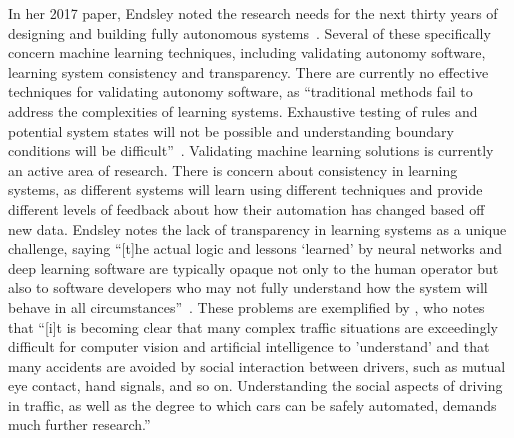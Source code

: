In her 2017 paper, Endsley noted the research needs for the next thirty years of designing and building fully autonomous systems~\citep{endsley_here_2017}.
Several of these specifically concern machine learning techniques, including validating autonomy software, learning system consistency and transparency.
There are currently no effective techniques for validating autonomy software, as ``traditional methods fail to address the complexities of learning systems.
Exhaustive testing of rules and potential system states will not be possible and understanding boundary conditions will be difficult''~\citep{endsley_here_2017}.
Validating machine learning solutions is currently an active area of research.
There is concern about consistency in learning systems, as different systems will learn using different techniques and provide different levels of feedback about how their automation has changed based off new data.
Endsley notes the lack of transparency in learning systems as a unique challenge, saying ``[t]he actual logic and lessons `learned' by neural networks and deep learning software are typically opaque not only to the human operator but also to software developers who may not fully understand how the system will behave in all circumstances''~\citep{endsley_here_2017}.
These problems are exemplified by \citeauthor{sheridan_humanrobot_2016}, who notes that ``[i]t is becoming clear that many complex traffic situations are exceedingly difficult for computer vision and artificial intelligence to 'understand' and that many accidents are avoided by social interaction between drivers, such as mutual eye contact, hand signals, and so on.
Understanding the social aspects of driving in traffic, as well as the degree to which cars can be safely automated, demands much further research.''

